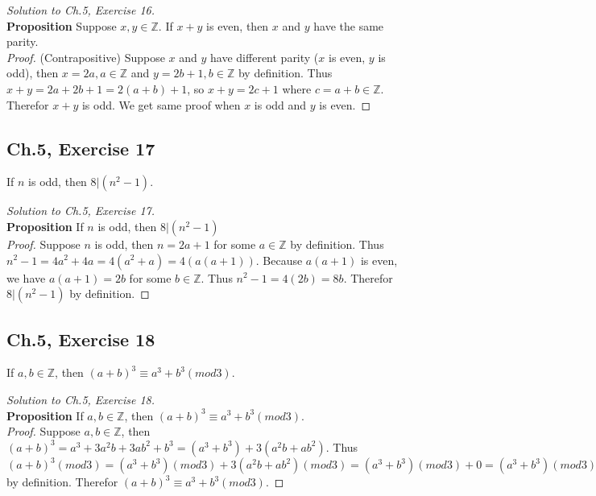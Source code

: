 \documentclass[12pt]{amsart}
\numberwithin{equation}{section}
\theoremstyle{definition}
\theoremstyle{remark}
\begin{document}
\begin{proof}[Solution to Ch.5,  Exercise 16]
\ \\
\textbf{Proposition}   Suppose $ x,y \in \mathbb{Z} $. If $ x + y $ is even, then $ x $ and $ y $ have the same parity. \\
\textit{Proof.} (Contrapositive) Suppose $ x $ and $ y $ have different parity ($ x $ is even, $ y $ is odd), then $ x = 2a, a \in \mathbb{Z} $ and $ y = 2b + 1, b \in \mathbb{Z} $ by definition. Thus $ x + y = 2a + 2b + 1 = 2(a + b) + 1 $, so $ x + y = 2c + 1 $ where $ c = a + b \in \mathbb{Z} $. Therefor $ x + y $ is odd. We get same proof when $ x $ is odd and $ y $ is even.

\end{proof}




\subsection*{Ch.5,  Exercise 17}  If $ n $ is odd, then $ 8 | (n^2 - 1) $.


\begin{proof}[Solution to Ch.5,  Exercise 17]
\ \\
\textbf{Proposition} If $ n $ is odd, then $ 8 | (n^2 - 1) $ \\
\textit{Proof.}  Suppose $ n $ is odd, then $ n = 2a + 1 $ for some $ a \in \mathbb{Z} $ by definition. Thus $ n^2 - 1 = 4a^2 + 4a = 4(a^2 + a) = 4(a(a+1)) $. Because $ a(a + 1) $ is even, we have $ a(a + 1) = 2b $ for some $ b \in \mathbb{Z} $. Thus $ n^2 - 1 = 4(2b) = 8b $. Therefor $ 8 | (n^2 - 1) $ by definition.

\end{proof}



\subsection*{Ch.5,  Exercise 18}  If $ a, b \in \mathbb{Z} $, then $ (a + b)^3 \equiv a^3 + b^3 (mod 3) $.



\begin{proof}[Solution to Ch.5,  Exercise 18]
\ \\
\textbf{Proposition} If $ a, b \in \mathbb{Z} $, then $ (a + b)^3 \equiv a^3 + b^3 (mod 3) $. \\
\textit{Proof.} Suppose $ a, b \in \mathbb{Z} $, then $ (a + b)^3 = a^3 + 3a^2b + 3ab^2 + b^3 = (a^3 + b^3) + 3(a^2b + ab^2) $. Thus $ (a + b)^3(mod 3) = (a^3 + b^3)(mod 3) + 3(a^2b + ab^2)(mod 3) = (a^3 + b^3)(mod 3) + 0 = (a^3 + b^3)(mod 3) $ by definition. Therefor $ (a + b)^3 \equiv a^3 + b^3 (mod 3) $.

\end{proof}
\end{document}
